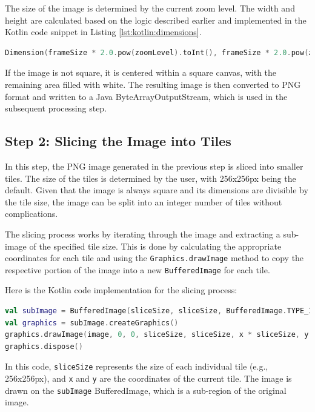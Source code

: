 The size of the image is determined by the current zoom level. The width and height are calculated based on the logic described earlier and implemented in the Kotlin code snippet in Listing \ref{lst:kotlin:dimensions}.

\begin{lstlisting}[language=Kotlin,caption=Image dimensions calculation,label=lst:kotlin:dimensions] 
Dimension(frameSize * 2.0.pow(zoomLevel).toInt(), frameSize * 2.0.pow(zoomLevel).toInt()) 
\end{lstlisting}

If the image is not square, it is centered within a square canvas, with the remaining area filled with white. The resulting image is then converted to PNG format and written to a Java ByteArrayOutputStream, which is used in the subsequent processing step.

\subsection{Step 2: Slicing the Image into Tiles}

In this step, the PNG image generated in the previous step is sliced into smaller tiles. The size of the tiles is determined by the user, with 256x256px being the default. Given that the image is always square and its dimensions are divisible by the tile size, the image can be split into an integer number of tiles without complications. 

The slicing process works by iterating through the image and extracting a sub-image of the specified tile size. This is done by calculating the appropriate coordinates for each tile and using the \texttt{Graphics.drawImage} method to copy the respective portion of the image into a new \texttt{BufferedImage} for each tile.

Here is the Kotlin code implementation for the slicing process:

\begin{lstlisting}[language=Kotlin,caption=Image Slicing Implementation,label=lst:kotlin:slicing]
val subImage = BufferedImage(sliceSize, sliceSize, BufferedImage.TYPE_INT_ARGB)
val graphics = subImage.createGraphics()
graphics.drawImage(image, 0, 0, sliceSize, sliceSize, x * sliceSize, y * sliceSize, (x + 1) * sliceSize, (y + 1) * sliceSize, null)
graphics.dispose()

\end{lstlisting}

In this code, \texttt{sliceSize} represents the size of each individual tile (e.g., 256x256px), and \texttt{x} and \texttt{y} are the coordinates of the current tile. The image is drawn on the \texttt{subImage} BufferedImage, which is a sub-region of the original image.

